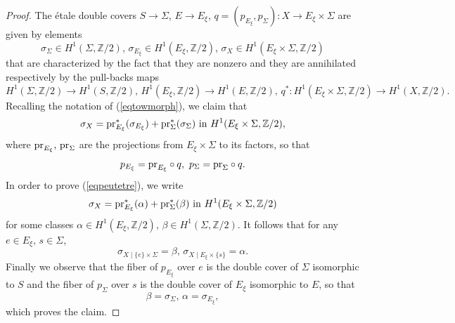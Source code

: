 \documentclass[10pt]{article}
\begin{document}
\begin{proof}
The \'{e}tale double covers $S\rightarrow \Sigma$, $E\rightarrow E_\xi$, $q=(p_{E_\xi},p_\Sigma):X\rightarrow E_\xi\times \Sigma$ are given by elements
$$\sigma_\Sigma\in  H^1(\Sigma,\mathbb{Z}/2),\,\sigma_{E_\xi}\in  H^1(E_\xi,\mathbb{Z}/2),\,\sigma_X\in  H^1(E_\xi\times \Sigma,\mathbb{Z}/2)$$ that are characterized by the fact that they are nonzero and they are annihilated respectively  by the pull-backs maps
$$H^1(\Sigma,\mathbb{Z}/2)\rightarrow H^1(S,\mathbb{Z}/2),\,H^1(E_\xi,\mathbb{Z}/2)\rightarrow H^1(E,\mathbb{Z}/2),\, q^*:H^1(E_\xi\times \Sigma,\mathbb{Z}/2)\rightarrow H^1(X,\mathbb{Z}/2).$$
Recalling the notation  of  (\ref{eqtowmorph}), we claim that
\begin{eqnarray}\label{eqpeutetre} \sigma_X={\rm pr}_{E_\xi}^*(\sigma_{E_\xi})+{\rm pr}_\Sigma^*(\sigma_\Sigma)\,\,{\rm in}\,\,H^1(E_\xi\times \Sigma,\mathbb{Z}/2),
\end{eqnarray}
where ${\rm pr}_{E_\xi},\,{\rm pr}_{\Sigma}$ are the projections from $E_\xi\times \Sigma$ to its factors, so that
\begin{eqnarray}\label{eqpetqeta} p_{E_\xi}={\rm pr}_{E_\xi}\circ q,\,\,p_{\Sigma}={\rm pr}_\Sigma\circ q.
\end{eqnarray}
In order to prove (\ref{eqpeutetre}), we write
$$\sigma_X={\rm pr}_{E_\xi}^*(\alpha)+{\rm pr}_\Sigma^*(\beta)\,\,{\rm in}\,\,H^1(E_\xi\times \Sigma,\mathbb{Z}/2)$$
for some classes $\alpha\in H^1(E_\xi,\mathbb{Z}/2),\,\beta\in H^1(\Sigma,\mathbb{Z}/2)$. It follows that
for any $e\in E_\xi,\,s\in \Sigma$,
$$\sigma_{X\mid \{e\}\times \Sigma}=\beta,\,\sigma_{X\mid E_\xi\times \{s\}}=\alpha.$$
Finally we observe that the fiber of $p_{E_\xi}$ over $e$ is the double cover of $\Sigma$ isomorphic to $S$ and the fiber of $p_\Sigma$ over $s$ is the double cover of $E_\xi$ isomorphic to $E$, so that
$$\beta=\sigma_\Sigma,\,\alpha=\sigma_{E_\xi},$$
which proves the claim.


\end{proof}
\end{document}
